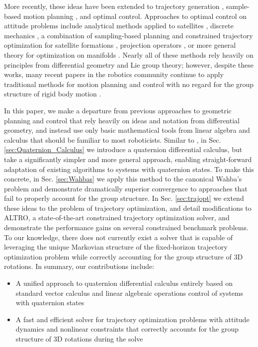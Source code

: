 \documentclass[letterpaper, 10 pt, conference]{ieeeconf}  %
\begin{document}
    More recently, these ideas have been extended to trajectory generation
    \cite{Zefran1998}, sample-based motion planning \cite{Zefran1999,Kuffner2004}, and
    optimal control. Approaches to optimal control on attitude problems include
    analytical methods applied to satellites \cite{Spindler1998}, discrete mechanics
    \cite{Kobilarov2011,Kobilarov2014, Lee2008}, a combination of sampling-based planning
    and constrained trajectory optimization for satellite formations \cite{Garcia2005,
    Aoude2008}, projection operators \cite{Saccon2013}, or more general theory for
    optimization on manifolds \cites{watterson2018trajectory}. Nearly all of these
    methods rely heavily on principles from differential geometry and Lie group theory;
    however, despite these works, many recent papers in the robotics community continue
    to apply traditional methods for motion planning and control with no regard for the
    group structure of rigid body motion \cite{Alothman2016,deCrousaz2015,
    Williams2017,Geisert2016}.
    
    In this paper, we make a departure from previous approaches to geometric planning and 
    control that rely heavily on ideas and notation from differential geometry, 
    and instead use only basic mathematical tools from linear algebra and calculus that 
    should be familiar to most roboticists. 
    Similar to \cite{Mandic2011,Xu2016}, in Sec. \ref{sec:Quaternion_Calculus} we introduce 
    a quaternion differential calculus, but take a significantly simpler and more general 
    approach, enabling straight-forward adaptation of 
    existing algorithms to systems with quaternion states. 
    To make this concrete, in Sec. \ref{sec:Wahbas} we apply this method to the canonical
    Wahba's problem and demonstrate dramatically superior convergence to approaches that
    fail to properly account for the group structure. 
    In Sec. \ref{sec:trajopt} we extend these ideas to the problem of trajectory optimization,
    and detail modifications to ALTRO, a state-of-the-art constrained trajectory optimization
    solver, and demonstrate the performance gains on several constrained benchmark problems.
    To our knowledge, there does not currently exist a solver that is capable of leveraging
    the unique Markovian structure of the fixed-horizon trajectory optimization problem while
    correctly accounting for the group structure of 3D rotations.
    In summary, our contributions include:

    \begin{itemize}
        \item A unified approach to quaternion differential calculus entirely based on
        standard vector calculus and linear algebraic operations control of systems with
        quaternion states
        \item A fast and efficient solver for trajectory optimization problems with 
        attitude dynamics and nonlinear constraints that correctly accounts for the group
        structure of 3D rotations during the solve
    \end{itemize}
\end{document}
